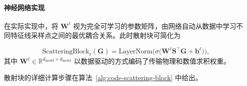 \paragraph{神经网络实现}
在实际实现中，将 $\bm{W}^\ell$ 视为完全可学习的参数矩阵，由网络自动从数据中学习不同特征线采样点之间的最优耦合关系。此时散射块可简化为

\begin{equation}\label{scattering_layer}
    \text{ScatteringBlock}_\ell(\bm{G}) = \text{LayerNorm}\Big(\sigma\Big(\bm{W}^{\ell} \bm{S}^{\top} \bm{G} + \bm{b}^{\ell}\Big)\Big),
\end{equation}
其中 $\bm{W}^{\ell} \in \mathbb{R}^{d_{\text{model}}\times d_{\text{model}}}$ 以数据驱动的方式编码了传输物理和数值求积权重。

散射块的详细计算步骤在算法~\ref{alg:code-scattering-block} 中给出。






